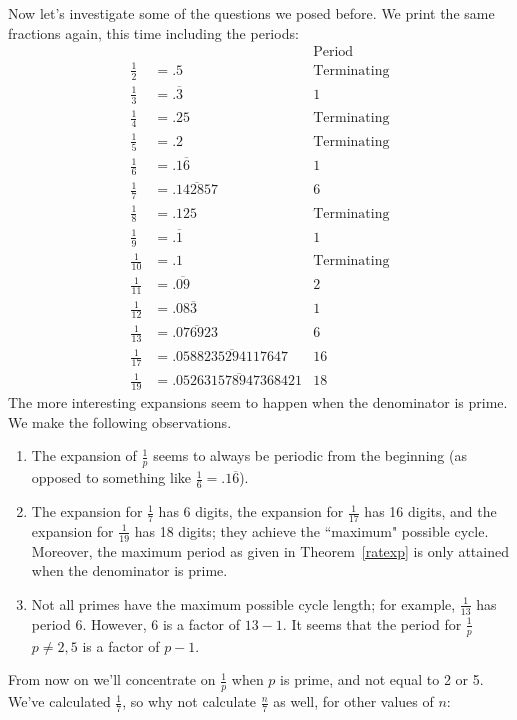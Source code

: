 \documentclass[12pt,twoside]{article}
\theoremstyle{norm}
\newtheorem{exr}[thm]{Exercise}
\newcommand{\rc}[1]{\frac{1}{#1}}
\begin{document}
Now let's investigate some of the questions we posed before. We print the same fractions again, this time including the periods:
\begin{align*}
&&\text{Period}\\
\rc{2}&=.5&\text{Terminating}\\
\rc{3}&=.\overline{3}&1\\
\rc{4}&=.25&\text{Terminating}\\
\rc{5}&=.2&\text{Terminating}\\
\rc{6}&=.1\overline{6}&1\\
\rc{7}&=.\overline{142857}&6\\
\rc{8}&=.125&\text{Terminating}\\
\rc{9}&=.\overline{1}&1\\
\rc{10}&=.1&\text{Terminating}\\
\rc{11}&=.\overline{09}&2\\
\rc{12}&=.08\overline{3}&1\\
\rc{13}&=.\overline{076923}&6\\
\rc{17}&=.\overline{0588235294117647}&16\\
\rc{19}&=.\overline{052631578947368421}&18
\end{align*}
The more interesting expansions seem to happen when the denominator is prime. We make the following observations.
\begin{enumerate}
\item The expansion of $\rc p$ seems to always be periodic from the beginning (as opposed to something like $\rc{6}=.1\overline 6$).
\item The expansion for $\rc 7$ has 6 digits, the expansion for $\rc{17}$ has 16 digits, and the expansion for $\rc{19}$ has 18 digits; they achieve the ``maximum" possible cycle. Moreover, the maximum period as given in Theorem~\ref{ratexp} is only attained when the denominator is prime.
\item Not all primes have the maximum possible cycle length; for example, $\rc{13}$ has period 6. However, $6$ is a factor of $13-1$. It seems that the period for $\rc{p}$ $p\neq 2,5$ is a factor of $p-1$.
\end{enumerate}
From now on we'll concentrate on $\rc p$ when $p$ is prime, and not equal to 2 or 5. We've calculated $\rc 7$, so why not calculate $\frac{n}{7}$ as well, for other values of $n$:
\end{document}
